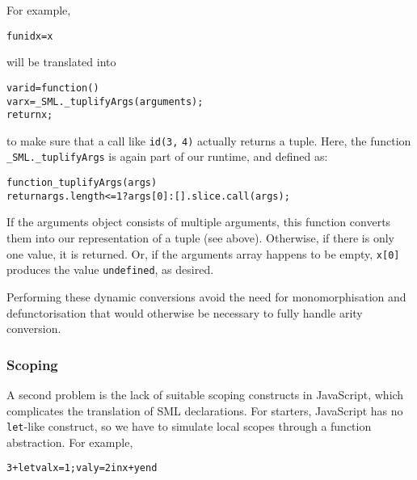 \documentclass[twoside,titlepage]{article}
\begin{document}
\begin{itemize}
For example,

\begin{quoting}
\begin{alltt}\small
fun id x = x
\end{alltt}
\end{quoting}

will be translated into

\begin{quoting}
\begin{alltt}\small
var id = function() \textbraceleft
  var x = _SML._tuplifyArgs(arguments);
  return x;
\textbraceright
\end{alltt}
\end{quoting}

to make sure that a call like {\tt id(3,} {\tt 4)} actually returns a tuple.
Here, the function {\tt \_SML.\_tuplifyArgs} is again part of our runtime, and defined as:

\begin{quoting}
\begin{alltt}\small
function _tuplifyArgs(args) \textbraceleft
  return args.length <= 1 ? args[0] : [].slice.call(args);
\textbraceright
\end{alltt}
\end{quoting}

If the arguments object consists of multiple arguments, this function converts them into our representation of a tuple (see above). Otherwise, if there is only one value, it is returned. Or, if the arguments array happens to be empty, {\tt x[0]} produces the value {\tt undefined}, as desired.

\end{itemize}

Performing these dynamic conversions avoid the need for monomorphisation and defunctorisation that would otherwise be necessary to fully handle arity conversion.


\subsubsection*{Scoping}

A second problem is the lack of suitable scoping constructs in JavaScript, which complicates the translation of SML declarations. For starters, JavaScript has no {\tt let}-like construct, so we have to simulate local scopes through a function abstraction.
For example,

\begin{quoting}
\begin{alltt}
3 + let val x = 1; val y = 2 in x + y end
\end{alltt}
\end{quoting}
\end{document}
